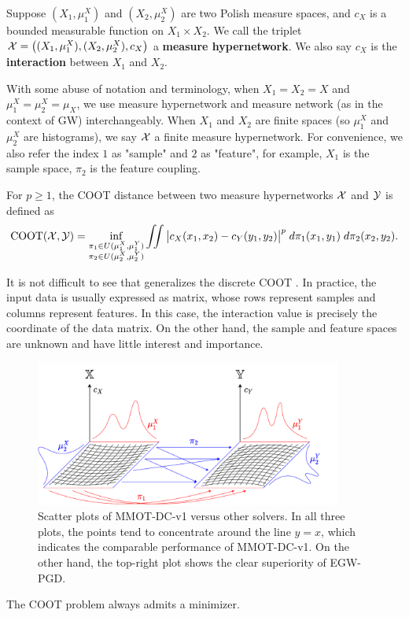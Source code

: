 \begin{definition}
Suppose $(X_1, \mu_1^X)$ and $(X_2, \mu_2^X)$ are two Polish measure spaces,
and $c_X$ is a bounded measurable function on $X_1 \times X_2$.
We call the triplet $\mathcal X = \big((X_1, \mu_1^X), (X_2, \mu_2^X), c_X \big)$
a \textbf{measure hypernetwork}. We also say $c_X$ is the \textbf{interaction}
between $X_1$ and $X_2$.
\end{definition}
With some abuse of notation and terminology, when $X_1 = X_2 = X$ and $\mu_1^X = \mu_2^X = \mu_X$,
we use measure hypernetwork and measure network (as in the context of GW) interchangeably.
When $X_1$ and $X_2$ are finite spaces (so $\mu_1^X$ and $\mu_2^X$ are histograms),
we say $\mathcal X$ a finite measure hypernetwork. For convenience, we also refer the index $1$ as "sample"
and $2$ as "feature", for example, $X_1$ is the sample space, $\pi_2$ is the feature coupling.
\begin{definition}
  For $p \geq 1$, the COOT distance between two measure hypernetworks $\mathcal X$ and $\mathcal Y$ is defined as
  \begin{align} \label{eq:cont_coot}
    \text{COOT}(\mathcal X, \mathcal Y) =
    \inf_{\substack{\pi_1 \in U(\mu^X_1, \mu^Y_1) \\
    \pi_2 \in U(\mu^X_2, \mu^Y_2)}} \iint
    \big\vert c_X(x_1, x_2) - c_Y(y_1, y_2) \big\vert^p \; d\pi_1(x_1, y_1) \; d\pi_2(x_2, y_2).
  \end{align}
\end{definition}
It is not difficult to see that  generalizes the discrete COOT \citep{Redko20}.
In practice, the input data is usually expressed as matrix,
whose rows represent samples and columns represent features.
In this case, the interaction value is precisely the coordinate of the data matrix.
On the other hand, the sample and feature spaces are unknown and have little interest and importance.

\begin{figure}[ht]
  \centering
  \includegraphics[width=0.9\textwidth, keepaspectratio]{./Chapitre2/fig/coot_diagram.pdf}
  \caption{Scatter plots of MMOT-DC-v1 versus other solvers. In all three plots, the points tend to concentrate around the line $y=x$,
  which indicates the comparable performance of MMOT-DC-v1. On the other hand, the top-right plot shows the clear superiority of EGW-PGD.}
  \label{fig:continuous_coot}
\end{figure}
\begin{proposition}
  \label{prop:exist_coot}
  The COOT problem always admits a minimizer.
\end{proposition}

